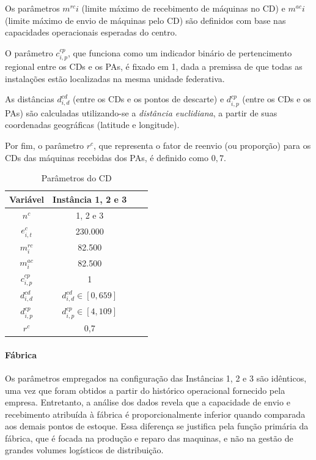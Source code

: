 Os parâmetros $m^{rc}{i}$ (limite máximo de recebimento de máquinas no CD) e $m^{ac}{i}$ (limite máximo de envio de máquinas pelo CD) são definidos com base nas capacidades operacionais esperadas do centro.

O parâmetro $c^{cp}_{i,p}$, que funciona como um indicador binário de pertencimento regional entre os CDs e os PAs, é fixado em 1, dada a premissa de que todas as instalações estão localizadas na mesma unidade federativa.

As distâncias $d^{cd}_{i,d}$ (entre os CDs e os pontos de descarte) e $d^{cp}_{i,p}$ (entre os CDs e os PAs) são calculadas utilizando-se a \textit{distância euclidiana}, a partir de suas coordenadas geográficas (latitude e longitude).

Por fim, o parâmetro $r^{c}$, que representa o fator de reenvio (ou proporção) para os CDs das máquinas recebidas dos PAs, é definido como $0,7$.  

\begin{table}[h!]
\centering
\caption{Parâmetros do CD}
\label{tab:parametros_cd}
\begin{tabular}{|c|c|c|c|}
\hline
\textbf{Variável} & \textbf{Instância 1, 2 e 3} \\
\hline
$n^{c}$ & 1, 2 e 3 \\
\hline
$e^{c}_{i,t}$ & 230.000 \\
\hline
$m^{rc}_{i}$ & 82.500 \\
\hline
$m^{ac}_{i}$ & 82.500 \\
\hline
$c^{cp}_{i,p}$ & 1 \\
\hline
$d^{cd}_{i,d}$ & $d^{cd}_{i,d} \in [0, 659]$ \\
\hline
$d^{cp}_{i,p}$ & $d^{cp}_{i,p} \in [4, 109]$ \\
\hline
$r^{c}$ & 0,7 \\
\hline
\end{tabular}
\end{table}

\paragraph[Fábrica]{Fábrica}
\label{Fábrica}

Os parâmetros empregados na configuração das Instâncias 1, 2 e 3 são idênticos, uma vez que foram obtidos a partir do histórico operacional fornecido pela empresa. Entretanto, a análise dos dados revela que a capacidade de envio e recebimento atribuída à fábrica é proporcionalmente inferior quando comparada aos demais pontos de estoque. Essa diferença se justifica pela função primária da fábrica, que é focada na produção e reparo das maquinas, e não na gestão de grandes volumes logísticos de distribuição.

